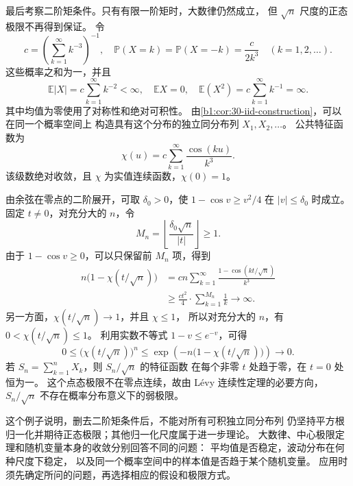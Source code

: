 \ProseParagraphBreak

最后考察二阶矩条件。只有有限一阶矩时，大数律仍然成立，
但 \(\sqrt n\) 尺度的正态极限不再得到保证。
令
\[
 c=\left(\sum_{k=1}^\infty k^{-3}\right)^{-1},\quad
 \mathbb P(X=k)=\mathbb P(X=-k)=\frac{c}{2k^3}
 \quad(k=1,2,\ldots).
\]
这些概率之和为一，并且
\[
 \mathbb E|X|=c\sum_{k=1}^\infty k^{-2}<\infty,\quad
 \mathbb EX=0,\quad
 \mathbb E(X^2)=c\sum_{k=1}^\infty k^{-1}=\infty.
\]
其中均值为零使用了对称性和绝对可积性。
由\cref{b1:cor:30-iid-construction}，可以在同一个概率空间上
构造具有这个分布的独立同分布列 \(X_1,X_2,\ldots\)。
公共特征函数为
\[
 \chi(u)=c\sum_{k=1}^\infty\frac{\cos(ku)}{k^3}.
\]
该级数绝对收敛，且 \(\chi\) 为实值连续函数，\(\chi(0)=1\)。

\ProseParagraphBreak

由余弦在零点的二阶展开，可取 \(\delta_0>0\)，使
\(1-\cos v\geq v^2/4\) 在 \(|v|\leq\delta_0\) 时成立。
固定 \(t\ne0\)，对充分大的 \(n\)，令
\[
 M_n=\left\lfloor\frac{\delta_0\sqrt n}{|t|}\right\rfloor\geq1.
\]
由于 \(1-\cos v\geq0\)，可以只保留前 \(M_n\) 项，得到
\begin{align*}
 n\bigl(1-\chi(t/\sqrt n)\bigr)
 &=cn\sum_{k=1}^\infty
       \frac{1-\cos(kt/\sqrt n)}{k^3}\\
 &\geq\frac{ct^2}{4}\cdot\sum_{k=1}^{M_n}\frac1k
 \longrightarrow\infty.
\end{align*}
另一方面，\(\chi(t/\sqrt n)\to1\)，并且 \(\chi\leq1\)，
所以对充分大的 \(n\)，有 \(0<\chi(t/\sqrt n)\leq1\)。
利用实数不等式 \(1-v\leq e^{-v}\)，可得
\[
 0\leq\bigl(\chi(t/\sqrt n)\bigr)^n
 \leq\exp\left(-n\bigl(1-\chi(t/\sqrt n)\bigr)\right)
 \longrightarrow0.
\]
若 \(S_n=\sum_{k=1}^nX_k\)，则 \(S_n/\sqrt n\) 的特征函数
在每个非零 \(t\) 处趋于零，在 \(t=0\) 处恒为一。
这个点态极限不在零点连续，故由 Lévy 连续性定理的必要方向，
\(S_n/\sqrt n\) 不存在概率分布意义下的弱极限。

\ProseParagraphBreak

这个例子说明，删去二阶矩条件后，不能对所有可积独立同分布列
仍坚持平方根归一化并期待正态极限；其他归一化尺度属于进一步理论。
大数律、中心极限定理和随机变量本身的收敛分别回答不同的问题：
平均值是否稳定，波动分布在何种尺度下稳定，
以及同一个概率空间中的样本值是否趋于某个随机变量。
应用时须先确定所问的问题，再选择相应的假设和极限方式。
